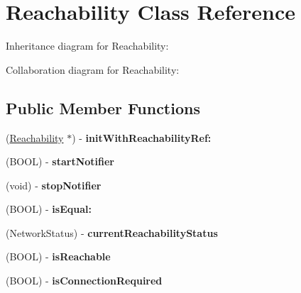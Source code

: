\hypertarget{interface_reachability}{
\section{\-Reachability \-Class \-Reference}
\label{interface_reachability}
}


\-Inheritance diagram for \-Reachability\-:


\-Collaboration diagram for \-Reachability\-:
\subsection*{\-Public \-Member \-Functions}
\begin{DoxyCompactItemize}
\item 
\hypertarget{interface_reachability_af8dbb23cc7f9ac59b0269dfaf83979fc}{
(\hyperlink{interface_reachability}{\-Reachability} $\ast$) -\/ {\bfseries init\-With\-Reachability\-Ref\-:}}
\label{interface_reachability_af8dbb23cc7f9ac59b0269dfaf83979fc}

\item 
\hypertarget{interface_reachability_ae20732960a222681fcc7caeb191158bc}{
(\-B\-O\-O\-L) -\/ {\bfseries start\-Notifier}}
\label{interface_reachability_ae20732960a222681fcc7caeb191158bc}

\item 
\hypertarget{interface_reachability_ab7907e9c8de0e4e15774e82c089e0b39}{
(void) -\/ {\bfseries stop\-Notifier}}
\label{interface_reachability_ab7907e9c8de0e4e15774e82c089e0b39}

\item 
\hypertarget{interface_reachability_a7158fbf023168ca543a1340d6b3ce7fb}{
(\-B\-O\-O\-L) -\/ {\bfseries is\-Equal\-:}}
\label{interface_reachability_a7158fbf023168ca543a1340d6b3ce7fb}

\item 
\hypertarget{interface_reachability_a8396438436e7ff3770039fb527cd1d34}{
(\-Network\-Status) -\/ {\bfseries current\-Reachability\-Status}}
\label{interface_reachability_a8396438436e7ff3770039fb527cd1d34}

\item 
\hypertarget{interface_reachability_ae0b18fcacc97f538502cf671aa583dbd}{
(\-B\-O\-O\-L) -\/ {\bfseries is\-Reachable}}
\label{interface_reachability_ae0b18fcacc97f538502cf671aa583dbd}

\item 
\hypertarget{interface_reachability_a294f9407cd32a05f26a480871df70901}{
(\-B\-O\-O\-L) -\/ {\bfseries is\-Connection\-Required}}
\label{interface_reachability_a294f9407cd32a05f26a480871df70901}


\end{DoxyCompactItemize}
